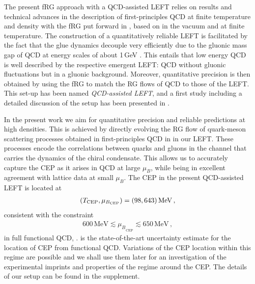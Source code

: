 \documentclass[reprint,twocolumn,superscriptaddress,preprintnumbers,amsmath,amssymb,aps,prd,floatfix]{revtex4-2}
\begin{document}
The present fRG approach with a QCD-assisted LEFT relies on results and technical advances in the description of first-principles QCD at finite temperature and density with the fRG put forward in \cite{Fu:2019hdw}, based on \cite{Braun:2007bx, Braun:2009gm, Mitter:2014wpa, Braun:2014ata, Rennecke:2015eba, Cyrol:2016tym, Cyrol:2017ewj, Cyrol:2017qkl} in the vacuum and at finite temperature. The construction of a quantitatively reliable LEFT is facilitated by the fact that the glue dynamics decouple very efficiently due to the gluonic mass gap of QCD at energy scales of about 1\,GeV \cite{Fu:2019hdw, Dupuis:2020fhh, Fu:2022gou}. This entails that low energy QCD is well described by the respective emergent LEFT: QCD without gluonic fluctuations but in a gluonic background. Moreover, quantitative precision is then obtained by using the fRG to match the RG flows of QCD to those of the LEFT.  This set-up has been named \textit{QCD-assisted LEFT}, and a first study including a detailed discussion of the setup has been presented in \cite{Fu:2021oaw}.

In the present work we aim for quantitative precision and reliable predictions at high densities. This is achieved by directly evolving the RG flow of quark-meson scattering processes obtained in first-principles QCD in \cite{Fu:2019hdw} in our LEFT. These processes encode the correlations between quarks and gluons in the channel that carries the dynamics of the chiral condensate. This allows us to accurately capture the CEP as it arises in QCD at large $\mu_B$, while being in excellent agreement with lattice data at small $\mu_B$. The CEP in the present QCD-assisted LEFT is located at   
%
\begin{align}
(T_\mathrm{CEP},\mu_{B_{\mathrm{CEP}}})=(98,643)\,{\rm MeV}\,,
\end{align}
%
consistent with the constraint  
%
\begin{align}
600\,\textrm{MeV} \lesssim {\mu_B}_{_{\mathrm{CEP}}}\lesssim 650\, \textrm{MeV}\,,
\label{eq:CEPEstimateQCD}
\end{align}
%
in full functional QCD, \cite{Fu:2019hdw, Gao:2020qsj, Gao:2020fbl, Gunkel:2021oya}.  is the state-of-the-art uncertainty estimate for the location of CEP from functional QCD. Variations of the CEP location within this regime are possible and we shall use them later for an investigation of the experimental imprints and properties of the regime around the CEP. The details of our setup can be found in the supplement. \\[-1.5ex] 
\end{document}
